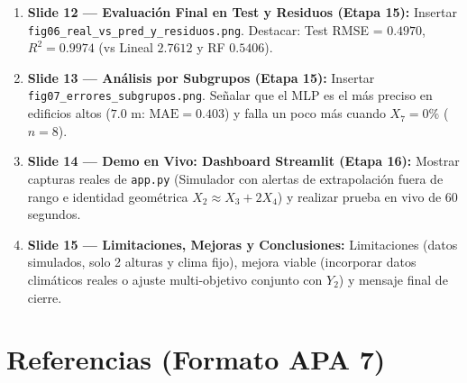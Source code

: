\documentclass[11pt,a4paper]{article}
\begin{document}
\begin{enumerate}[leftmargin=1.4em, itemsep=6pt]
    \item \textbf{Slide 12 — Evaluación Final en Test y Residuos (Etapa 15):} Insertar \texttt{fig06\_real\_vs\_pred\_y\_residuos.png}. Destacar: Test RMSE = $0.4970$, $R^2 = 0.9974$ (vs Lineal $2.7612$ y RF $0.5406$).
    \item \textbf{Slide 13 — Análisis por Subgrupos (Etapa 15):} Insertar \texttt{fig07\_errores\_subgrupos.png}. Señalar que el MLP es el más preciso en edificios altos ($7.0\text{ m}$: $\text{MAE}=0.403$) y falla un poco más cuando $X_7=0\%$ ($n=8$).
    \item \textbf{Slide 14 — Demo en Vivo: Dashboard Streamlit (Etapa 16):} Mostrar capturas reales de \texttt{app.py} (Simulador con alertas de extrapolación fuera de rango e identidad geométrica $X_2 \approx X_3 + 2X_4$) y realizar prueba en vivo de 60 segundos.
    \item \textbf{Slide 15 — Limitaciones, Mejoras y Conclusiones:} Limitaciones (datos simulados, solo 2 alturas y clima fijo), mejora viable (incorporar datos climáticos reales o ajuste multi-objetivo conjunto con $Y_2$) y mensaje final de cierre.
\end{enumerate}

\section{Referencias (Formato APA 7)}
\end{document}
